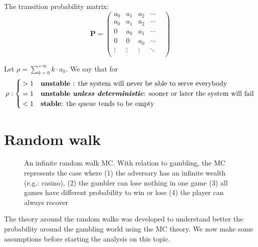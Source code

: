 The transition probability matrix:
\begin{equation} \bm P=\begin{pmatrix}
	a_{0} & a_{1} & a_2 & \cdots  \\
	a_{0} & a_{1} & a_2 & \cdots  \\
	0			& a_{0} & a_{1} & \cdots  \\
	0 		& 0			& a_{0} & \cdots  \\
	\vdots & \vdots & \vdots & \ddots &  \\
\end{pmatrix}
\end{equation}
\begin{definition}[Behavior of a MC]
Let $\rho=\sum\limits_{k=0}^{+\infty} k \cdot a_k$. We say that for
\begin{equation} \rho : \begin{cases}
	>1 & \text{\textbf{unstable }: the system will never be able to serve everybody}\\
	=1 & \text{\textbf{unstable \textit{unless deterministic}}: sooner or later the system will fail}\\
	<1 & \text{\textbf{stable}: the queue tends to be empty}
\end{cases}\end{equation}
\end{definition}


\section{Random walk}
\begin{figure}[h]
	\centering
	
	\caption{An infinite random walk MC. With relation to gambling, the MC represents the case
	where (1) the adversary has an infinite wealth (e.g.: casino), (2) the gambler can lose nothing in one game
	(3) all games have different probability to win or lose (4) the player can always recover }
\end{figure}
The theory around the random walks was developed to understand better the probability around the
gambling world using the MC theory. We now make some assumptions before starting the analysis on this topic.
